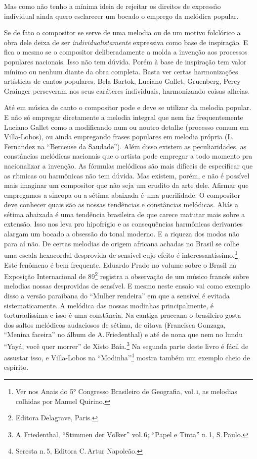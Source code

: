 Mas como não tenho a mínima ideia de rejeitar os direitos de expressão
individual ainda quero esclarecer um bocado o emprego da melódica
popular.

Se de fato o compositor se serve de uma melodia ou de um motivo
folclórico a obra dele deixa de ser \textit{individualistamente} expressiva como
base de inspiração. E fica o mesmo se o compositor deliberadamente a
molda a invenção aos processos populares nacionais. Isso não tem dúvida.
Porém à base de inspiração tem valor mínimo ou nenhum diante da obra
completa. Basta ver certas harmonizações artísticas de cantos populares.
Bela Bartok, Luciano Gallet, Gruenberg, Percy Grainger perseveram nos
seus caráteres individuais, harmonizando coisas alheias.

Até em música de canto o compositor pode e deve se utilizar da melodia
popular. E não só empregar diretamente a melodia integral que nem faz
frequentemente Luciano Gallet como a modificando num ou noutro detalhe
(processo comum em Villa-Lobos), ou ainda empregando frases populares em
melodia própria (L.\,Fernandez na ``Berceuse da Saudade''). Além disso
existem as peculiaridades, as constâncias melódicas nacionais que o
artista pode empregar a todo momento pra nacionalizar a invenção. As
fórmulas melódicas são mais difíceis de especificar que as rítmicas ou
harmônicas não tem dúvida. Mas existem, porém, e não é possível mais
imaginar um compositor que não seja um erudito da arte dele. Afirmar que
empregamos a sincopa ou a sétima abaixada é uma puerilidade. O
compositor deve conhecer quais são as nossas tendências e constâncias
melódicas. Aliás a sétima abaixada é uma tendência brasileira de que
carece matutar mais sobre a extensão. Isso nos leva pro hipofrígio e as
consequências harmônicas derivantes alargam um bocado a obsessão do
tonal moderno. E a riqueza dos modos não para aí não. De certas melodias
de origem africana achadas no Brasil se colhe uma escala hexacordal
desprovida de sensível cujo efeito é interessantíssimo.\footnote{Ver nos Anais do
5° Congresso Brasileiro de Geografia, vol.\,\textsc{i}, as melodias colhidas por
Manuel Quirino.} Este fenômeno é bem frequente. Eduardo Prado no volume
sobre o Brasil na Exposição Internacional de 89\footnote{Editora Delagrave, Paris.} 
registra a observação de um músico francês sobre melodias nossas
desprovidas de sensível. E mesmo neste ensaio vai como exemplo disso a
versão paraibana do ``Mulher rendeira'' em que a sensível é evitada
sistematicamente. A melódica das nossas modinhas principalmente, é
torturadíssima e isso é uma constância. Na cantiga praceana o brasileiro
gosta dos saltos melódicos audaciosos de sétima, de oitava (Francisca
Gonzaga, ``Menina faceira'' no álbum de A.\,Friedenthal) e até de nona que
nem no lundu ``Yayá, você quer morrer'' de Xisto Baía.\footnote{A.\,Friedenthal,
``Stimmen der Völker'' vol.\,6; ``Papel e Tinta'' n.\,1, S.\,Paulo.} Na segunda
parte deste livro é fácil de assustar isso, e Villa-Lobos na ``Modinha''\footnote{Seresta n.\,5, Editora C.\,Artur Napoleão.} mostra também um exemplo cheio de
espírito.

